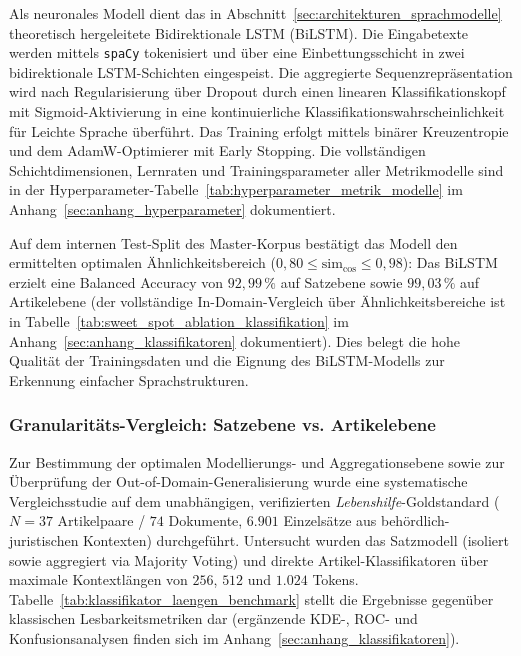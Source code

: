 Als neuronales Modell dient das in Abschnitt~\ref{sec:architekturen_sprachmodelle} theoretisch hergeleitete Bidirektionale LSTM (BiLSTM). Die Eingabetexte werden mittels \texttt{spaCy} tokenisiert und über eine Einbettungsschicht in zwei bidirektionale LSTM-Schichten eingespeist. Die aggregierte Sequenzrepräsentation wird nach Regularisierung über Dropout durch einen linearen Klassifikationskopf mit Sigmoid-Aktivierung in eine kontinuierliche Klassifikationswahrscheinlichkeit für Leichte Sprache überführt. Das Training erfolgt mittels binärer Kreuzentropie und dem AdamW-Optimierer \citep{loshchilov2019decoupled} mit Early Stopping. Die vollständigen Schichtdimensionen, Lernraten und Trainingsparameter aller Metrikmodelle sind in der Hyperparameter-Tabelle~\ref{tab:hyperparameter_metrik_modelle} im Anhang~\ref{sec:anhang_hyperparameter} dokumentiert.

Auf dem internen Test-Split des Master-Korpus bestätigt das Modell den ermittelten optimalen Ähnlichkeitsbereich ($0{,}80 \le \text{sim}_{\cos} \le 0{,}98$): Das BiLSTM erzielt eine Balanced Accuracy von $92{,}99\,\%$ auf Satzebene sowie $99{,}03\,\%$ auf Artikelebene (der vollständige In-Domain-Vergleich über Ähnlichkeitsbereiche ist in Tabelle~\ref{tab:sweet_spot_ablation_klassifikation} im Anhang~\ref{sec:anhang_klassifikatoren} dokumentiert). Dies belegt die hohe Qualität der Trainingsdaten und die Eignung des BiLSTM-Modells zur Erkennung einfacher Sprachstrukturen.

\subsubsection{Granularitäts-Vergleich: Satzebene vs. Artikelebene}
\label{sec:klassifikator_laengen_ablation}

Zur Bestimmung der optimalen Modellierungs- und Aggregationsebene sowie zur Überprüfung der Out-of-Domain-Generalisierung wurde eine systematische Vergleichsstudie auf dem unabhängigen, verifizierten \textit{Lebenshilfe}-Goldstandard ($N = 37$ Artikelpaare / $74$ Dokumente, $6.901$ Einzelsätze aus behördlich-juristischen Kontexten) durchgeführt. Untersucht wurden das Satzmodell (isoliert sowie aggregiert via Majority Voting) und direkte Artikel-Klassifikatoren über maximale Kontextlängen von $256$, $512$ und $1.024$ Tokens. Tabelle~\ref{tab:klassifikator_laengen_benchmark} stellt die Ergebnisse gegenüber klassischen Lesbarkeitsmetriken dar (ergänzende KDE-, ROC- und Konfusionsanalysen finden sich im Anhang~\ref{sec:anhang_klassifikatoren}).

